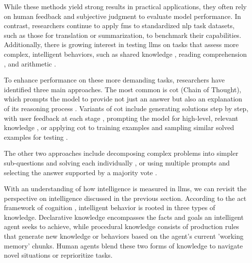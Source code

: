 

While these methods yield strong results in practical applications, they often rely on human feedback and subjective judgment to evaluate model performance. In contrast, researchers continue to apply \glspl{fm} to standardized \gls{nlp} task datasets, such as those for translation or summarization, to benchmark their capabilities. Additionally, there is growing interest in testing \glspl{llm} on tasks that assess more complex, intelligent behaviors, such as shared knowledge \cite{talmor2019commonsenseqaquestionansweringchallenge}, reading comprehension \cite{zhang2018recordbridginggaphuman}, and arithmetic \cite{cobbe2021trainingverifierssolvemath}.

\pskip

To enhance performance on these more demanding tasks, researchers have identified three main approaches. The most common is \gls{cot} (Chain of Thought), which prompts the model to provide not just an answer but also an explanation of its reasoning process \cite{wei2023chainofthoughtpromptingelicitsreasoning}. Variants of \gls{cot} include generating solutions step by step, with user feedback at each stage \cite{zhou2023threadthoughtunravelingchaotic}, prompting the model for high-level, relevant knowledge \cite{zheng2024stepbackevokingreasoning}, or applying \gls{cot} to training examples and sampling similar solved examples for testing \cite{li2024dialoguepromptingpolicygradientbaseddiscrete}. 

\pskip

The other two approaches include decomposing complex problems into simpler sub-questions and solving each individually \cite{patel2022questiondecompositionunitneed} \cite{wang2023planandsolvepromptingimprovingzeroshot}, or using multiple prompts and selecting the answer supported by a majority vote \cite{khalifa2023exploringdemonstrationensemblingincontext} \cite{wang2023selfconsistencyimproveschainthought}.

\pskip

 With an understanding of how intelligence is measured in \glspl{llm}, we can revisit the perspective on intelligence discussed in the previous section. According to the \Gls{act} framework of cognition \cite{Anderson2013}, intelligent behavior is rooted in three types of knowledge. Declarative knowledge encompasses the facts and goals an intelligent agent seeks to achieve, while procedural knowledge consists of production rules that generate new knowledge or behaviors based on the agent's current 'working memory' chunks. Human agents blend these two forms of knowledge to navigate novel situations or reprioritize tasks.

